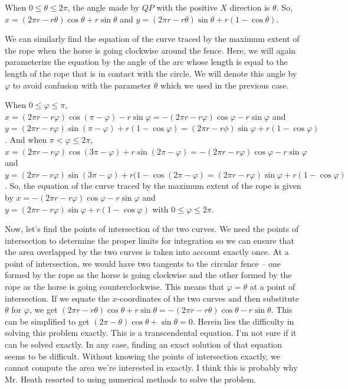 \documentclass{article}
\begin{document}
When $0 \le \theta \le 2 \pi$, the angle made by $QP$ with the positive $X$ direction is $\theta$. So, $x = (2 \pi r - r \theta) \cos \theta + r \sin \theta$ and $y = (2 \pi r - r \theta) \sin \theta + r(1 - \cos \theta)$.

We can similarly find the equation of the curve traced by the maximum extent of the rope when the horse is going clockwise around the fence. Here, we will again parameterize the equation by the angle of the arc whose length is equal to the length of the rope that is in contact with the circle. We will denote this angle by $\varphi$ to avoid confusion with the parameter $\theta$ which we used in the previous case.

When $0 \le \varphi \le \pi$, $x = (2 \pi r - r \varphi)\cos(\pi - \varphi) - r \sin \varphi = -(2 \pi r - r \varphi)\cos \varphi - r \sin \varphi$ and $y = (2 \pi r - r \varphi) \sin(\pi - \varphi) + r(1 - \cos \varphi) = (2 \pi r - r \phi)\sin \varphi + r(1 - \cos \varphi)$. And when $\pi < \varphi \le 2 \pi$, $x = (2 \pi r - r \varphi)\cos(3 \pi - \varphi) + r \sin(2 \pi - \varphi) = -(2 \pi r - r \varphi)\cos \varphi - r \sin \varphi$ and $y = (2 \pi r - r \varphi)\sin(3 \pi - \varphi) + r (1 - \cos(2 \pi - \varphi) = (2 \pi r - r \varphi)\sin \varphi + r(1 - \cos \varphi)$. So, the equation of the curve traced by the maximum extent of the rope is given by $x = -(2 \pi r - r \varphi)\cos \varphi - r \sin \varphi$ and $y = (2 \pi r - r \varphi)\sin \varphi + r(1 - \cos \varphi)$ with $0 \le \varphi \le 2 \pi$.

Now, let's find the points of intersection of the two curves. We need the points of intersection to determine the proper limits for integration so we can ensure that the area overlapped by the two curves is taken into account exactly once. At a point of intersection, we would have two tangents to the circular fence -- one formed by the rope as the horse is going clockwise and the other formed by the rope as the horse is going counterclockwise. This means that $\varphi = \theta$ at a point of intersection. If we equate the $x$-coordinates of the two curves and then substitute $\theta$ for $\varphi$, we get $(2 \pi r - r \theta)\cos \theta + r \sin \theta = -(2 \pi r - r \theta)\cos \theta - r \sin \theta$. This can be simplified to get $(2 \pi - \theta)\cos \theta + \sin \theta = 0$. Herein lies the difficulty in solving this problem exactly. This is a transcendental equation. I'm not sure if it can be solved exactly. In any case, finding an exact solution of that equation seems to be difficult. Without knowing the points of intersection exactly, we cannot compute the area we're interested in exactly. I think this is probably why Mr. Heath resorted to using numerical methods to solve the problem.
\end{document}
